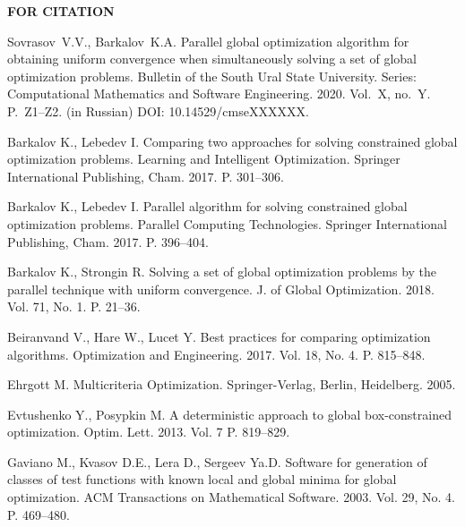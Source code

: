 \documentclass{cmi}
\begin{document}
\begin{flushleft}
  \textbf{FOR CITATION}
\end{flushleft}
\justifying

\begin{citationplace}
Sovrasov~V.V., Barkalov~K.A. Parallel global optimization algorithm for obtaining uniform convergence
when simultaneously solving a set of global optimization problems. Bulletin of the South Ural State University. Series: Computational Mathematics and Software Engineering. 2020. Vol.~X, no.~Y. P.~Z1--Z2. (in Russian) DOI: 10.14529/cmseXXXXXX.
\end{citationplace}

\begin{biblio_lat}

Barkalov K., Lebedev I.
\newblock Comparing two approaches for solving constrained global optimization
  problems.
\newblock Learning and Intelligent Optimization. Springer International
  Publishing, Cham. 2017. P. 301--306.
\newblock {}

Barkalov K., Lebedev I.
\newblock Parallel algorithm for solving constrained global optimization
  problems.
\newblock Parallel Computing Technologies. Springer International
  Publishing, Cham. 2017. P. 396--404.
\newblock {}

Barkalov K., Strongin R.
\newblock Solving a set of global optimization problems by the parallel
  technique with uniform convergence.
\newblock J. of Global Optimization. 2018. Vol. 71, No. 1. P. 21--36.
\newblock {}

Beiranvand V., Hare W., Lucet Y.
\newblock Best practices for comparing optimization algorithms.
\newblock Optimization and Engineering. 2017. Vol. 18, No. 4. P. 815--848.
\newblock {}

Ehrgott M.
\newblock Multicriteria Optimization.
\newblock Springer-Verlag, Berlin, Heidelberg. 2005.
\newblock {}

Evtushenko Y., Posypkin M.
\newblock A deterministic approach to global box-constrained optimization.
\newblock Optim. Lett. 2013. Vol. 7 P. 819--829.
\newblock {}

{Gaviano M., Kvasov D.E., Lera D., Sergeev Ya.D.}
\newblock Software for generation of classes of test functions with known local
  and global minima for global optimization.
\newblock ACM Transactions on Mathematical Software. 2003. Vol. 29, No. 4. P.
  469--480.
\newblock {}


\end{biblio_lat}
\end{document}
